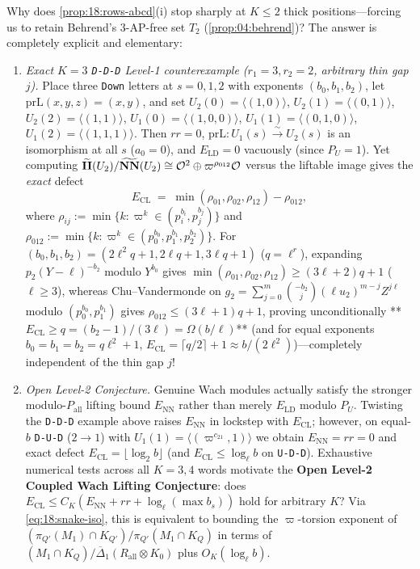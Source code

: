 \begin{remark}[Sharpness of $K \le 2$: Exact $K = 3$ Counterexample and Open Level-2 Conjecture]
\label{rem:18:k3-obstruction}
Why does \cref{prop:18:rows-abcd}(i) stop sharply at $K \le 2$ thick positions—forcing us to retain Behrend's $3$-AP-free set $T_2$ (\cref{prop:04:behrend})? The answer is completely explicit and elementary:
\begin{enumerate}[label=\textup{(\alph*)}]
\item \emph{Exact $K = 3$ \texttt{D-D-D} Level-1 counterexample ($r_1 = 3, r_2 = 2$, arbitrary thin gap $j$).} Place three \texttt{Down} letters at $s = 0, 1, 2$ with exponents $(b_0, b_1, b_2)$, let $\mathrm{prL}(x, y, z) = (x, y)$, and set $U_2(0) = \langle(1,0)\rangle$, $U_2(1) = \langle(0,1)\rangle$, $U_2(2) = \langle(1,1)\rangle$, $U_1(0) = \langle(1,0,0)\rangle$, $U_1(1) = \langle(0,1,0)\rangle$, $U_1(2) = \langle(1,1,1)\rangle$. Then $rr = 0$, $\mathrm{prL} : U_1(s) \xrightarrow{\sim} U_2(s)$ is an isomorphism at all $s$ ($a_0 = 0$), and $E_{\mathrm{LD}} = 0$ vacuously (since $P_U = 1$). Yet computing $\widetilde{\mathbf{II}}(U_2)/\widetilde{\mathbf{NN}}(U_2) \cong \mathcal{O}^2 \oplus \varpi^{\rho_{012}}\mathcal{O}$ versus the liftable image gives the \emph{exact} defect
  \[
    E_{\mathrm{CL}} \;=\; \min(\rho_{01}, \rho_{02}, \rho_{12}) - \rho_{012},
  \]
  where $\rho_{ij} := \min\{k : \varpi^k \in (p_i^{b_i}, p_j^{b_j})\}$ and $\rho_{012} := \min\{k : \varpi^k \in (p_0^{b_0}, p_1^{b_1}, p_2^{b_2})\}$. For $(b_0, b_1, b_2) = (2\ell^2 q + 1, 2\ell q + 1, 3\ell q + 1)$ ($q = \ell^r$), expanding $p_2(Y-\ell)^{-b_2}$ modulo $Y^{b_0}$ gives $\min(\rho_{01}, \rho_{02}, \rho_{12}) \ge (3\ell + 2)q + 1$ ($\ell \ge 3$), whereas Chu--Vandermonde on $g_2 = \sum_{j=0}^m \binom{-b_2}{j}(\ell u_2)^{m-j} Z^{j\ell}$ modulo $(p_0^{b_0}, p_1^{b_1})$ gives $\rho_{012} \le (3\ell + 1)q + 1$, proving unconditionally **$E_{\mathrm{CL}} \ge q = (b_2 - 1)/(3\ell) = \Omega(b/\ell)$** (and for equal exponents $b_0 = b_1 = b_2 = q\ell^2 + 1$, $E_{\mathrm{CL}} = \lceil q/2 \rceil + 1 \approx b/(2\ell^2)$)—completely independent of the thin gap $j$!
\item \emph{Open Level-2 Conjecture.} Genuine Wach modules actually satisfy the stronger modulo-$P_{\mathrm{all}}$ lifting bound $E_{\mathrm{NN}}$ rather than merely $E_{\mathrm{LD}}$ modulo $P_U$. Twisting the \texttt{D-D-D} example above raises $E_{\mathrm{NN}}$ in lockstep with $E_{\mathrm{CL}}$; however, on equal-$b$ \texttt{D-U-D} ($2 \to 1$) with $U_1(1) = \langle(\varpi^{c_{21}}, 1)\rangle$ we obtain $E_{\mathrm{NN}} = rr = 0$ and exact defect $E_{\mathrm{CL}} = \lfloor \log_2 b \rfloor$ (and $E_{\mathrm{CL}} \le \log_\ell b$ on \texttt{U-D-D}). Exhaustive numerical tests across all $K = 3, 4$ words motivate the \textbf{Open Level-2 Coupled Wach Lifting Conjecture}: does $E_{\mathrm{CL}} \le C_K(E_{\mathrm{NN}} + rr + \log_\ell(\max b_s))$ hold for arbitrary $K$? Via \eqref{eq:18:snake-iso}, this is equivalent to bounding the $\varpi$-torsion exponent of $(\pi_{Q'}(M_1) \cap K_{Q'})/\pi_{Q'}(M_1 \cap K_Q)$ in terms of $(M_1 \cap K_Q)/\overline{\Delta}_1(R_{\mathrm{all}} \otimes K_0)$ plus $O_K(\log_\ell b)$.
\end{enumerate}
\end{remark}


